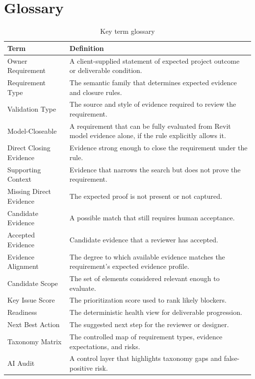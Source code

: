 \documentclass[10pt,letterpaper]{article}
\begin{document}
\section{Glossary}

\begin{longtable}{p{1.7in}p{4.95in}}
\caption{Key term glossary}\\
\toprule
\textbf{Term} & \textbf{Definition} \\
\midrule
\endhead
Owner Requirement & A client-supplied statement of expected project outcome or deliverable condition. \\
Requirement Type & The semantic family that determines expected evidence and closure rules. \\
Validation Type & The source and style of evidence required to review the requirement. \\
Model-Closeable & A requirement that can be fully evaluated from Revit model evidence alone, if the rule explicitly allows it. \\
Direct Closing Evidence & Evidence strong enough to close the requirement under the rule. \\
Supporting Context & Evidence that narrows the search but does not prove the requirement. \\
Missing Direct Evidence & The expected proof is not present or not captured. \\
Candidate Evidence & A possible match that still requires human acceptance. \\
Accepted Evidence & Candidate evidence that a reviewer has accepted. \\
Evidence Alignment & The degree to which available evidence matches the requirement's expected evidence profile. \\
Candidate Scope & The set of elements considered relevant enough to evaluate. \\
Key Issue Score & The prioritization score used to rank likely blockers. \\
Readiness & The deterministic health view for deliverable progression. \\
Next Best Action & The suggested next step for the reviewer or designer. \\
Taxonomy Matrix & The controlled map of requirement types, evidence expectations, and risks. \\
AI Audit & A control layer that highlights taxonomy gaps and false-positive risk. \\

\end{longtable}
\end{document}
